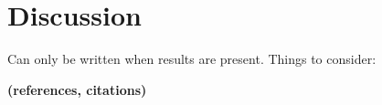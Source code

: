 
\section{Discussion} %
\label{sec:discussion}

Can only be written when results are present.
Things to consider:




{\bf (references, citations)}
